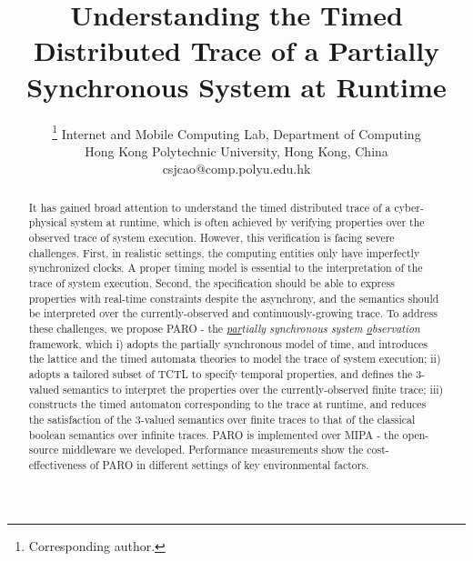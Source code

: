 \documentclass[10pt,conference,compsocconf,letterpaper]{IEEEtran}
\begin{document}
\title{Understanding the Timed Distributed Trace of a Partially Synchronous System at Runtime}

\author{
\thanks{Corresponding author.}
Internet and Mobile Computing Lab, Department of Computing\\
Hong Kong Polytechnic University, Hong Kong, China\\
csjcao@comp.polyu.edu.hk
}

\maketitle

\begin{abstract}
    It has gained broad attention to understand the timed distributed trace of a cyber-physical system at runtime, which is often achieved by verifying properties over the observed trace of system execution. However, this verification is facing severe challenges. First, in realistic settings, the computing entities only have imperfectly synchronized clocks. A proper timing model is essential to the interpretation of the trace of system execution. Second, the specification should be able to express properties with real-time constraints despite the asynchrony, and the semantics should be interpreted over the currently-observed and continuously-growing trace. To address these challenges, we propose \textsf{PARO} - the \textit{\underline{par}tially synchronous system \underline{o}bservation} framework, which i) adopts the partially synchronous model of time, and introduces the lattice and the timed automata theories to model the trace of system execution; ii) adopts a tailored subset of TCTL to specify temporal properties, and defines the 3-valued semantics to interpret the properties over the currently-observed finite trace; iii) constructs the timed automaton corresponding to the trace at runtime, and reduces the satisfaction of the 3-valued semantics over finite traces to that of the classical boolean semantics over infinite traces. \textsf{PARO} is implemented over MIPA - the open-source middleware we developed. Performance measurements show the cost-effectiveness of \textsf{PARO} in different settings of key environmental factors.
\end{abstract}
\end{document}

